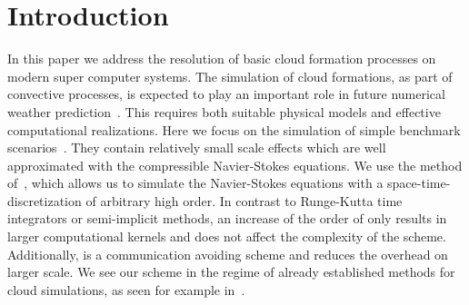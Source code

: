 \documentclass[runningheads]{llncs}
\begin{document}
\section{Introduction}
In this paper we address the resolution of basic cloud formation processes on modern super computer systems.
The simulation of cloud formations, as part of convective processes, is expected to play an important role in future numerical weather prediction~\cite{bauer2015quiet}.
This requires both suitable physical models and effective computational realizations. 
Here we focus on the simulation of simple benchmark scenarios~\cite{giraldo2008study}.
They contain relatively small scale effects which are well approximated with the compressible Navier-Stokes equations.
We use the \aderdg{} method of~\cite{dumbser2008unified}, which allows us to simulate the Navier-Stokes equations with a space-time-discretization of arbitrary high order.
In contrast to Runge-Kutta time integrators or semi-implicit methods, an increase of the order of \aderdg{} only results in larger computational kernels and does not affect the complexity of the scheme.
Additionally, \aderdg{} is a communication avoiding scheme and reduces the overhead on larger scale.
We see our scheme in the regime of already established methods for cloud simulations, as seen for example in~\cite{giraldo2008study,muller2010adaptive,muller2018strong}.
\end{document}
